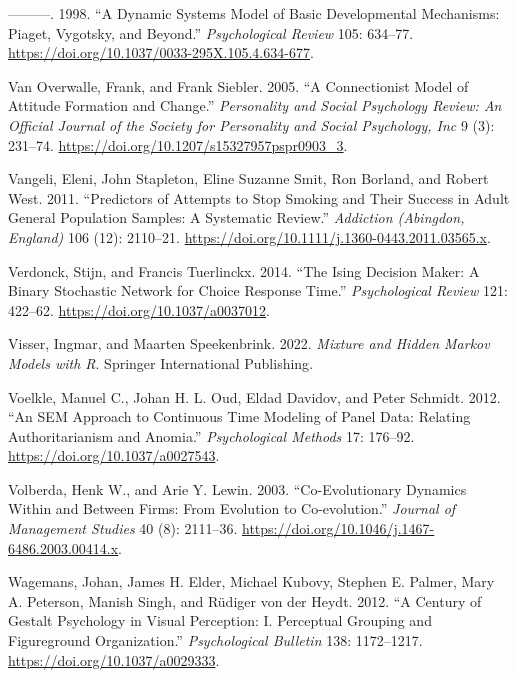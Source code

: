 \documentclass[
  a4paper,
  DIV=11,
  numbers=noendperiod,
  oneside]{scrreprt}
\newlength{\cslhangindent}
\newlength{\cslentryspacingunit} %
\newenvironment{CSLReferences}[2] %
 {%
  \setlength{\parindent}{0pt}
  \ifodd #1
  \let\oldpar\par
  \def\par{\hangindent=\cslhangindent\oldpar}
  \fi
  \setlength{\parskip}{#2\cslentryspacingunit}
 }%
 {}
\begin{document}
\begin{CSLReferences}{1}{0}
\leavevmode{}%
---------. 1998. {``A Dynamic Systems Model of Basic Developmental
Mechanisms: {Piaget}, {Vygotsky}, and Beyond.''} \emph{Psychological
Review} 105: 634--77.
\url{https://doi.org/10.1037/0033-295X.105.4.634-677}.

\leavevmode{}%
Van Overwalle, Frank, and Frank Siebler. 2005. {``A Connectionist Model
of Attitude Formation and Change.''} \emph{Personality and Social
Psychology Review: An Official Journal of the Society for Personality
and Social Psychology, Inc} 9 (3): 231--74.
\url{https://doi.org/10.1207/s15327957pspr0903_3}.

\leavevmode{}%
Vangeli, Eleni, John Stapleton, Eline Suzanne Smit, Ron Borland, and
Robert West. 2011. {``Predictors of Attempts to Stop Smoking and Their
Success in Adult General Population Samples: A Systematic Review.''}
\emph{Addiction (Abingdon, England)} 106 (12): 2110--21.
\url{https://doi.org/10.1111/j.1360-0443.2011.03565.x}.

\leavevmode{}%
Verdonck, Stijn, and Francis Tuerlinckx. 2014. {``The {Ising Decision
Maker}: {A} Binary Stochastic Network for Choice Response Time.''}
\emph{Psychological Review} 121: 422--62.
\url{https://doi.org/10.1037/a0037012}.

\leavevmode{}%
Visser, Ingmar, and Maarten Speekenbrink. 2022. \emph{Mixture and
{Hidden Markov Models} with {R}}. {Springer International Publishing}.

\leavevmode{}%
Voelkle, Manuel C., Johan H. L. Oud, Eldad Davidov, and Peter Schmidt.
2012. {``An {SEM} Approach to Continuous Time Modeling of Panel Data:
{Relating} Authoritarianism and Anomia.''} \emph{Psychological Methods}
17: 176--92. \url{https://doi.org/10.1037/a0027543}.

\leavevmode{}%
Volberda, Henk W., and Arie Y. Lewin. 2003. {``Co-Evolutionary {Dynamics
Within} and {Between Firms}: {From Evolution} to {Co-evolution}.''}
\emph{Journal of Management Studies} 40 (8): 2111--36.
\url{https://doi.org/10.1046/j.1467-6486.2003.00414.x}.

\leavevmode{}%
Wagemans, Johan, James H. Elder, Michael Kubovy, Stephen E. Palmer, Mary
A. Peterson, Manish Singh, and Rüdiger von der Heydt. 2012. {``A Century
of {Gestalt} Psychology in Visual Perception: {I}. {Perceptual} Grouping
and Figure\textendash ground Organization.''} \emph{Psychological
Bulletin} 138: 1172--1217. \url{https://doi.org/10.1037/a0029333}.


\end{CSLReferences}
\end{document}
